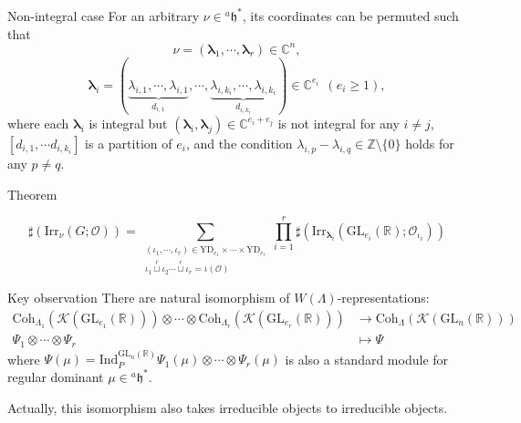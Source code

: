 \documentclass[fleqn,xcolor=dvipsnames]{beamer}
\newcommand{\blam}{{\boldsymbol{\lambda}}}
\newcommand{\BC}{{\mathbb {C}}}
\newcommand{\BR}{{\mathbb {R}}}
\newcommand{\BZ}{{\mathbb {Z}}}
\newcommand{\CK}{{\mathcal {K}}}
\newcommand{\CO}{{\mathcal {O}}}
\newcommand{\fh}{\mathfrak{h}}
\newcommand{\GL}{{\mathrm{GL}}}
\newcommand{\Ind}{{\mathrm{Ind}}}
\newcommand{\Irr}{{\mathrm{Irr}}}
\begin{document}
\begin{frame}{Non-integral case}
  For an arbitrary $\nu \in {^{a}\fh}^*$, its coordinates can be permuted such that 
        \[
        \nu = (\blam_1, \cdots, \blam_r) \in \BC^n,
        \]
        \[
        \blam_i = (\underbrace{\lambda_{i,1}, \cdots, \lambda_{i,1}}_{d_{i,1}}, \cdots, \underbrace{\lambda_{i,k_i}, \cdots, \lambda_{i,k_i}}_{d_{i,k_i}}) \in \BC^{e_i} \ \ (e_i \geq 1),
        \]  
        where each $\blam_i$ is integral but $(\blam_i,\blam_j) \in \BC^{e_i+e_j}$ is not integral for any $i \neq j$, $[d_{i,1}, \cdots d_{i,k_i} ]$ is a partition of $e_i$, and the condition $\lambda_{i,p} - \lambda_{i,q} \in \BZ \setminus \{0\}$ holds for any $p \neq q$.
  \pause\begin{block}{Theorem}
    
        \begin{equation*}
            \sharp(\Irr_{\nu}(G;\CO)) = \sum_{\substack{(\iota_1,\cdots,\iota_r) \in \mathrm{YD}_{e_1} \times \cdots \times \mathrm{YD}_{e_r} \\ \iota_1 \mathop{\sqcup}\limits^r \iota_2 \cdots \mathop{\sqcup}\limits^r  \iota_r = \iota(\CO) }}\prod_{i=1}^{r}\sharp(\Irr_{\blam_i}(\GL_{e_i}(\BR);\CO_{\iota_i}))
        \end{equation*}
  \end{block}
\end{frame}






\begin{frame}{Key observation}
  There are natural isomorphism of $W(\Lambda)$-representations:
  \begin{align*}
    \mathrm{Coh}_{\Lambda_1}(\CK(\GL_{e_1}(\BR))) \otimes \cdots \otimes \mathrm{Coh}_{\Lambda_r}(\CK(\GL_{e_r}(\BR))) &\to \mathrm{Coh}_{\Lambda}(\CK(\GL_{n}(\BR)))\\
    \Psi_1 \otimes \cdots \otimes \Psi_r & \mapsto \Psi
  \end{align*}
  where $\Psi(\mu) = \Ind_{P}^{\GL_{n}(\BR)}\Psi_1(\mu) \otimes \cdots \otimes \Psi_r(\mu)$ is also a standard module for regular dominant $\mu \in {^{a}\fh}^*$.\par
  Actually, this isomorphism also takes irreducible objects to irreducible objects.
\end{frame}
\end{document}
